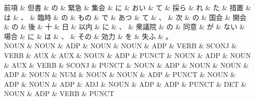 \documentclass[tikz,border=5pt]{standalone}
\begin{document}
\small
\begin{dependency}[edge unit distance=8.9pt]
    \begin{deptext}[column sep=0.5em]
        前項 \& 但書 \& の \& 緊急 \& 集会 \& に \& おい \& て \& 採ら \& れ \& た \& 措置 \& は \& 、 \& 臨時 \& の \& もの \& で \& あつ \& て \& 、 \& 次 \& の \& 国会 \& 開会 \& の \& 後 \& 十 \& 日 \& 以内 \& に \& 、 \& 衆議院 \& の \& 同意 \& が \& ない \& 場合 \& に \& は \& 、 \& その \& 効力 \& を \& 失ふ \& 。\\
        NOUN \& NOUN \& ADP \& NOUN \& NOUN \& ADP \& VERB \& SCONJ \& VERB \& AUX \& AUX \& NOUN \& ADP \& PUNCT \& NOUN \& ADP \& NOUN \& AUX \& VERB \& SCONJ \& PUNCT \& NOUN \& ADP \& NOUN \& NOUN \& ADP \& NOUN \& NUM \& NOUN \& NOUN \& ADP \& PUNCT \& NOUN \& ADP \& NOUN \& ADP \& ADJ \& NOUN \& ADP \& ADP \& PUNCT \& DET \& NOUN \& ADP \& VERB \& PUNCT\\
    \end{deptext}
\end{dependency}
\end{document}
